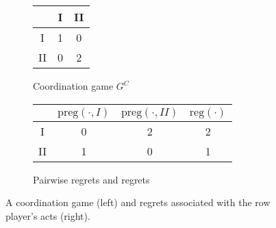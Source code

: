 \documentclass[fleqn,reqno,11pt]{article}
\begin{document}
\begin{figure}

  \begin{subfigure}[b]{0.3\textwidth}
    \centering
    \begin{tabular}{ccc}
      \toprule
      & I & II \\
      \midrule
      I & 1 & 0 \\
      II & 0 & 2\\
      \bottomrule
    \end{tabular}
    \caption{Coordination game $G^C$}
    \label{coordgame1}
  \end{subfigure}
  \hspace{1cm}
  \begin{subfigure}[b]{0.5\textwidth}
    \centering
    \begin{tabular}{ccc|c}
      \toprule
      & $\text{preg}( \cdot, I)$ & $\text{preg}(\cdot, II)$ & $\text{reg}(\cdot)$ \\
      \midrule
      I  & 0 & 2 & 2 \\ 
      II & 1 & 0 & 1\\
      \bottomrule
    \end{tabular}
    \caption{Pairwise regrets and regrets}
    \label{coordgame1reg}
  \end{subfigure}
  \caption{A coordination game (left) and regrets associated with the row player's acts (right).}
    \label{coordgame1mainFig}
\end{figure}
\end{document}
